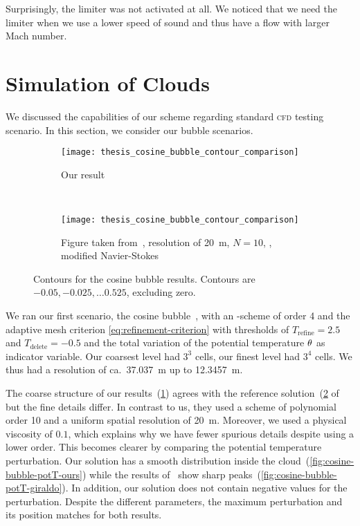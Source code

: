 Surprisingly, the limiter was not activated at all.
We noticed that we need the limiter when we use a lower speed of sound and thus have a flow with larger Mach number.

\section{Simulation of Clouds}\label{sec:results-cloud}
We discussed the capabilities of our scheme regarding standard \textsc{cfd} testing scenario.
In this section, we consider our bubble scenarios.
\begin{figure}[htb]
  \centering
  \begin{subfigure}[t]{0.5\textwidth}
    \centering
    \texttt{[image: thesis\_cosine\_bubble\_contour\_comparison]}
    \caption{\label{fig:cosine-bubble-contour-ours}%
      Our result}
  \end{subfigure}~%
  \begin{subfigure}[t]{0.5\textwidth}
    \centering
    \texttt{[image: thesis\_cosine\_bubble\_contour\_comparison]}
    \caption{\label{fig:cosine-bubble-contour-giraldo}%
      Figure taken from~\cite{giraldo2008study}, resolution of \SI{20}{\m}, $N = 10$, \dg{}, modified Navier-Stokes} %
  \end{subfigure}
  \caption{\label{fig:cosine-bubble-contour}%
    Contours for the cosine bubble results.
    Contours are $-0.05, -0.025, \ldots 0.525$, excluding zero.
  }
\end{figure}
We ran our first scenario, the cosine bubble~, with an \aderdg{}-scheme of order 4 and the adaptive mesh criterion \cref{eq:refinement-criterion} with thresholds of $T_\text{refine} = 2.5$ and $T_\text{delete} = -0.5$ and the total variation of the potential temperature $\theta$ as indicator variable.
Our coarsest level had $3^3$ cells, our finest level had $3^4$ cells.
We thus had a resolution of ca.\ \SI{37.037}{\m} up to \SI{12.3457}{\m}.

The coarse structure of our results~(\cref{fig:cosine-bubble-contour-ours}) agrees with the reference solution~(\cref{fig:cosine-bubble-contour-giraldo} of~\cite{giraldo2008study} but the fine details differ.
In contrast to us, they used a scheme of polynomial order 10 and a uniform spatial resolution of \SI{20}{\m}.
Moreover, we used a physical viscosity of $0.1$, which explains why we have fewer spurious details despite using a lower order.
This becomes clearer by comparing the potential temperature perturbation.
Our solution has a smooth distribution inside the cloud~(\cref{fig:cosine-bubble-potT-ours}) while the results of~\cite{giraldo2008study} show sharp peaks~(\cref{fig:cosine-bubble-potT-giraldo}).
In addition, our solution does not contain negative values for the perturbation.
Despite the different parameters, the maximum perturbation and its position matches for both results.

